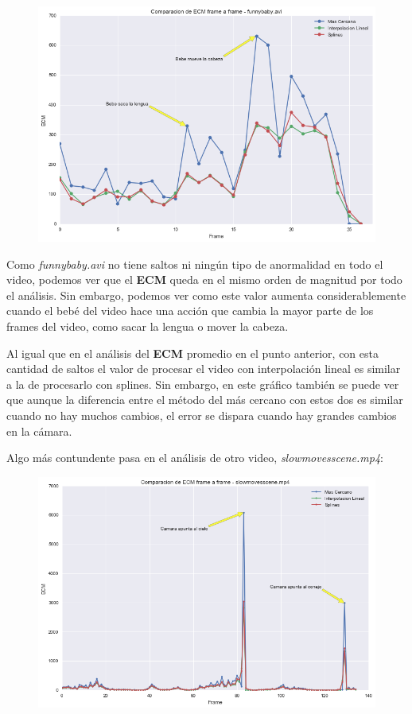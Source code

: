 \begin{figure}[H]
\centering
\includegraphics[width=.95\textwidth]{graficos/ecm_frame_funnybaby.png}
\end{figure}

Como \textit{funnybaby.avi} no tiene saltos ni ning\'un tipo de anormalidad en
todo el video, podemos ver que el \textbf{ECM} queda en el mismo orden de
magnitud por todo el an\'alisis. Sin embargo, podemos ver como este valor
aumenta considerablemente cuando el beb\'e del video hace una acci\'on que
cambia la mayor parte de los frames del video, como sacar la lengua o mover la
cabeza.

Al igual que en el an\'alisis del \textbf{ECM} promedio en el punto anterior,
con esta cantidad de saltos el valor de procesar el video con interpolaci\'on
lineal es similar a la de procesarlo con splines. Sin embargo, en este gr\'afico
tambi\'en se puede ver que aunque la diferencia entre el m\'etodo del m\'as
cercano con estos dos es similar cuando no hay muchos cambios, el error se
dispara cuando hay grandes cambios en la c\'amara.

Algo m\'as contundente pasa en el an\'alisis de otro video,
\textit{slowmovesscene.mp4}:

\begin{figure}[H]
\centering
\includegraphics[width=.95\textwidth]{graficos/ecm_frame_slowmovescene.png}
\end{figure}

